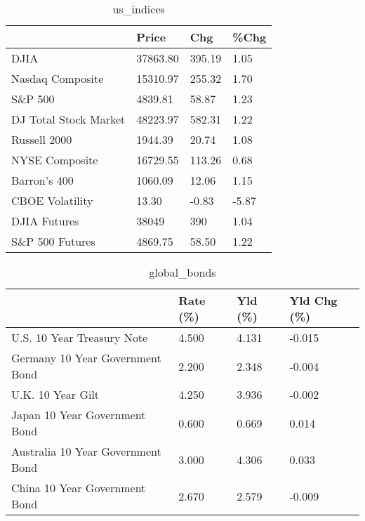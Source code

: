 \documentclass{article}%
\begin{document}
%


\begin{table}[htbp]%
\caption{us\_indices}%
\centering%
\begin{adjustbox}{width=1\textwidth}%
\begin{tabular}{llll}
\toprule
                      &    Price &    Chg &  \%Chg \\
\midrule
                 DJIA & 37863.80 & 395.19 &  1.05 \\
     Nasdaq Composite & 15310.97 & 255.32 &  1.70 \\
              S\&P 500 &  4839.81 &  58.87 &  1.23 \\
DJ Total Stock Market & 48223.97 & 582.31 &  1.22 \\
         Russell 2000 &  1944.39 &  20.74 &  1.08 \\
       NYSE Composite & 16729.55 & 113.26 &  0.68 \\
         Barron's 400 &  1060.09 &  12.06 &  1.15 \\
      CBOE Volatility &    13.30 &  -0.83 & -5.87 \\
         DJIA Futures &    38049 &    390 &  1.04 \\
      S\&P 500 Futures &  4869.75 &  58.50 &  1.22 \\
\bottomrule
\end{tabular}
%
\end{adjustbox}%
\end{table}

%


\begin{table}[htbp]%
\caption{global\_bonds}%
\centering%
\begin{adjustbox}{width=1\textwidth}%
\begin{tabular}{llll}
\toprule
                                  & Rate (\%) & Yld (\%) & Yld Chg (\%) \\
\midrule
       U.S. 10 Year Treasury Note &    4.500 &   4.131 &      -0.015 \\
  Germany 10 Year Government Bond &    2.200 &   2.348 &      -0.004 \\
                U.K. 10 Year Gilt &    4.250 &   3.936 &      -0.002 \\
    Japan 10 Year Government Bond &    0.600 &   0.669 &       0.014 \\
Australia 10 Year Government Bond &    3.000 &   4.306 &       0.033 \\
    China 10 Year Government Bond &    2.670 &   2.579 &      -0.009 \\
\bottomrule
\end{tabular}
%
\end{adjustbox}%
\end{table}
\end{document}
